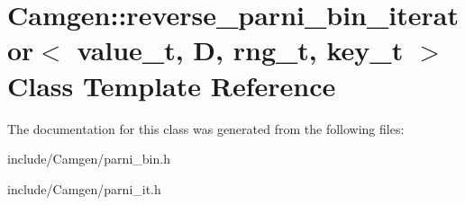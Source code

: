 \hypertarget{a00478}{}\section{Camgen\+:\+:reverse\+\_\+parni\+\_\+bin\+\_\+iterator$<$ value\+\_\+t, D, rng\+\_\+t, key\+\_\+t $>$ Class Template Reference}
\label{a00478}


The documentation for this class was generated from the following files\+:\begin{DoxyCompactItemize}
\item 
include/\+Camgen/parni\+\_\+bin.\+h\item 
include/\+Camgen/parni\+\_\+it.\+h\end{DoxyCompactItemize}

